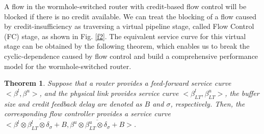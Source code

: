 \documentclass[preprint]{elsarticle}
\newtheorem{thm}{Theorem}
\begin{document}
A flow in the wormhole-switched router with credit-based flow control will be blocked if there is no credit available. We can treat the blocking of a flow caused by credit-insufficiency as traversing a virtual pipeline stage, called Flow Control (FC) stage, as shown in Fig. \ref{f2}. The equivalent service curve for this virtual stage can be obtained by the following theorem, which enables us to break the cyclic-dependence caused by flow control and build a comprehensive performance model for the wormhole-switched router.
\begin{thm}\label{credit}
Suppose that a router provides a feed-forward service curve $<\beta^l,\beta^u>$, and the physical link provides service curve $<\beta_{LT}^l,\beta_{LT}^u>$, the buffer size and credit feedback delay are denoted as $B$ and $\sigma$, respectively. Then, the corresponding flow controller provides a service curve $<\overline{\beta^l\otimes\beta_{LT}^l\otimes\delta_{\sigma}+B},\overline{\beta^u\otimes\beta_{LT}^u\otimes\delta_{\sigma}+B}>$.
\end{thm}
\end{document}
